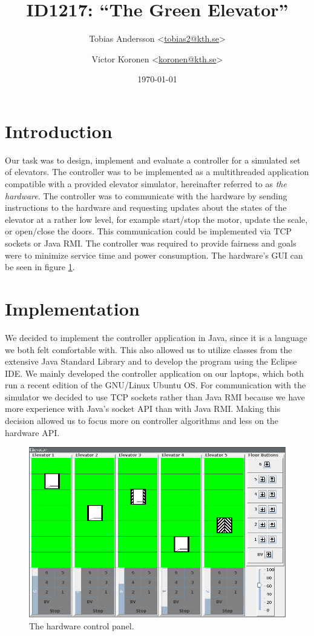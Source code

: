 \documentclass[a4paper]{article}
\title{ID1217: ``The Green Elevator''}
\author{%
    Tobias Andersson <\href{mailto:tobias2@kth.se}{tobias2@kth.se}> \and
    Victor Koronen <\href{mailto:koronen@kth.se}{koronen@kth.se}>
}
\date{\today}
\begin{document}
\maketitle
\thispagestyle{empty}

\section{Introduction}

Our task was to design, implement and evaluate a controller for a simulated set
of elevators. The controller was to be implemented as a multithreaded
application compatible with a provided elevator simulator, hereinafter referred
to as \emph{the hardware}. The controller was to communicate with the hardware
by sending instructions to the hardware and requesting updates about the states
of the elevator at a rather low level, for example start/stop the motor, update
the scale, or open/close the doors. This communication could be implemented via
TCP sockets or Java RMI. The controller was required to provide fairness and
goals were to minimize service time and power consumption. The hardware's GUI
can be seen in figure \ref{fig:hardware_control_panel}.

\section{Implementation}

We decided to implement the controller application in Java, since it is a
language we both felt comfortable with. This also allowed us to utilize classes
from the extensive Java Standard Library and to develop the program using the
Eclipse IDE. We mainly developed the controller application on our laptops,
which both run a recent edition of the GNU/Linux Ubuntu OS. For communication
with the simulator we decided to use TCP sockets rather than Java RMI because we
have more experience with Java's socket API than with Java RMI. Making this
decision allowed us to focus more on controller algorithms and less on the
hardware API.

\begin{figure}[h!]
    \centering
    \includegraphics[width=1.0\textwidth]{images/elevators_5_6.png}
    \caption{The hardware control panel.}
    \label{fig:hardware_control_panel}
\end{figure}
\end{document}

